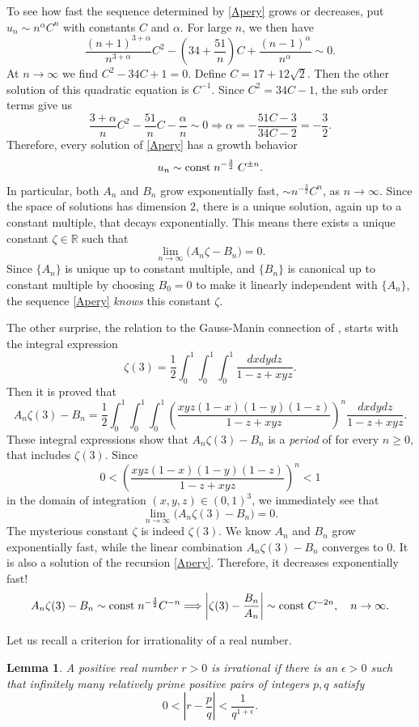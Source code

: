 \documentclass{amsart}
\newtheorem{lem}[thm]{Lemma}
\theoremstyle{definition}
\numberwithin{equation}{section}
\numberwithin{figure}{section}
\def\const{{\text{\rm{const}}}}
\def\a{\alpha}
\def\e{\epsilon}
\newcommand{\be}{\begin{equation}}
\newcommand{\ee}{\end{equation}}
\newcommand{\bR}{{\mathbb{R}}}
\newcommand{\rar}{\rightarrow}
\begin{document}
To see how fast the sequence determined by \eqref{Apery} grows or decreases, 
put $u_n \sim n^\a C^n$ with  constants $C$ and $\a$.
For large $n$, we then have
$$
\frac{(n+1)^{3+\a}}{n^{3+\a}}  C^2
-\left(34+\frac{51}{n}\right)C + \frac{(n-1)^\a}{n^\a} \sim 0.
$$
At $n\rar \infty$ we find  $C^2-34C+1=0$. Define $C=17+12\sqrt{2}$. 
Then the other solution of this quadratic equation is $C^{-1}$. 
Since $C^2=34C-1$, the sub order terms give us
$$
\frac{3+\a}{n}C^2 -\frac{51}{n}C -\frac{\a}{n}\sim 0
\Longrightarrow \a = -\frac{51C-3}{34C-2}=-\frac{3}{2}.
$$
Therefore, every solution of \eqref{Apery} has a growth behavior
\be
\label{growth}
u_n \sim \const\; n^{-\frac{3}{2}} \; C^{\pm n}.
\ee
In particular, both $A_n$ and $B_n$ grow 
exponentially fast, $\sim n^{-\frac{3}{2}}C^n$,  as $n\rar\infty$.
Since the space of solutions has dimension $2$, 
there is a unique solution, again up to a constant multiple, 
that decays exponentially. This means there exists a
unique constant $\zeta\in \bR$ such that 
$$
\lim_{n\rar \infty} \big(A_n\zeta-B_n\big) = 0.
$$
Since $\{A_n\}$ is unique up to constant multiple, and $\{B_n\}$ is canonical
up to constant multiple
by choosing $B_0=0$ to 
make it linearly independent with $\{A_n\}$, the sequence \eqref{Apery}
\emph{knows} this constant $\zeta$. 


The other surprise, the relation to the Gauss-Manin connection
of \cite{BP}, starts with 
the integral expression
$$
\zeta(3) = \frac{1}{2}\int_0^1\int_0^1\int_0^1 \frac{dxdydz}{1-z+xyz}.
$$
Then it is proved that
\be
\label{B/A}
A_n\zeta(3) -B_n = \frac{1}{2}\int_0^1\int_0^1\int_0^1
\left(\frac{xyz(1-x)(1-y)(1-z)}{1-z+xyz}\right)^n
 \frac{dxdydz}{1-z+xyz}. 
\ee
These integral expressions show that $A_n\zeta(3) -B_n$ is a
\emph{period} of \cite{KZ} for every $n\ge 0$, that includes $\zeta(3)$. 
Since
$$
0< \left(\frac{xyz(1-x)(1-y)(1-z)}{1-z+xyz}\right)^n<1
$$
in the domain of integration $(x,y,z)\in (0,1)^3$, we immediately see that 
$$
\lim_{n\rar \infty} \big(A_n\zeta(3)-B_n\big) = 0.
$$
The mysterious constant $\zeta$ is indeed $\zeta(3)$. 
We know  $A_n$ and $B_n$ grow exponentially
fast, while the linear combination $A_n\zeta(3)-B_n$
converges to $0$. It is also a solution of the 
recursion \eqref{Apery}. Therefore, it decreases 
exponentially fast!
\be
\label{z(3)estimate}
A_n\zeta(3)-B_n \sim \const \; n^{-\frac{3}{2}}C^{-n}
\Longrightarrow \left|\zeta(3)-\frac{B_n}{A_n}\right|\sim \const \; C^{-2n},
\quad n\rar \infty.
\ee


Let us recall a criterion for irrationality of a real number.
\begin{lem}
\label{irr}
A positive real number $r>0$ is irrational if there is an $\epsilon>0$
such that  infinitely many relatively prime 
positive pairs of integers $p,q$ satisfy 
$$
0<\left|r-\frac{p}{q}\right|< \frac{1}{q^{1+\e}}.
$$
\end{lem}
\end{document}
